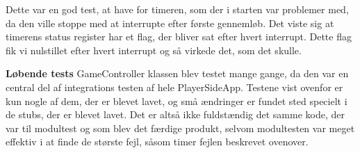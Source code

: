 \documentclass[Modultest/Modultest_main.tex]{subfiles}
\begin{document}
Dette var en god test, at have for timeren, som der i starten var problemer med, da den ville stoppe med at interrupte efter første gennemløb. Det viste sig at timerens status register har et flag, der bliver sat efter hvert interrupt. Dette flag fik vi nulstillet efter hvert interrupt og så virkede det, som det skulle.

\textbf{Løbende tests}
GameController klassen blev testet mange gange, da den var en central del af integrations testen af hele PlayerSideApp. Testene vist ovenfor er kun nogle af dem, der er blevet lavet, og små ændringer er fundet sted specielt i de stubs, der er blevet lavet. Det er altså ikke fuldstændig det samme kode, der var til modultest og som blev det færdige produkt, selvom modultesten var meget effektiv i at finde de største fejl, såsom timer fejlen beskrevet ovenover. 
\end{document}
